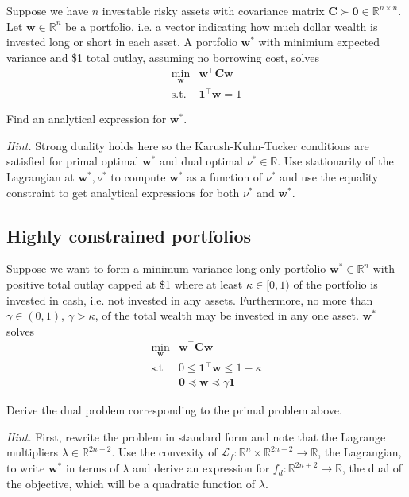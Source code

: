 \documentclass{article}
\numberwithin{equation}{section}
\begin{document}
Suppose we have $ n $ investable risky assets with covariance matrix
$ \mathbf{C} \succ \mathbf{0} \in \mathbb{R}^{n \times n} $. Let
$ \mathbf{w} \in \mathbb{R}^n $ be a portfolio, i.e. a vector indicating how
much dollar wealth is invested long or short in each asset. A portfolio
$ \mathbf{w}^* $ with minimium expected variance and \$1 total outlay,
assuming no borrowing cost, solves
\begin{equation*}
    \begin{array}{ll}
        \displaystyle\min_{\mathbf{w}} & \mathbf{w}^\top\mathbf{Cw} \\
        \text{s.t.} & \mathbf{1}^\top\mathbf{w} = 1
    \end{array}
\end{equation*}

Find an analytical expression for $ \mathbf{w}^* $.

\medskip

\textit{Hint.} Strong duality holds here so the Karush-Kuhn-Tucker conditions
are satisfied for primal optimal $ \mathbf{w}^* $ and dual optimal
$ \nu^* \in \mathbb{R} $. Use stationarity of the Lagrangian at
$ \mathbf{w}^*, \nu^* $ to compute $ \mathbf{w}^* $ as a function of
$ \nu^* $ and use the equality constraint to get analytical expressions for
both $ \nu^* $ and $ \mathbf{w}^* $.

\subsection{Highly constrained portfolios}

Suppose we want to form a minimum variance long-only portfolio
$ \mathbf{w}^* \in \mathbb{R}^n $ with positive total outlay capped at \$1
where at least $ \kappa \in [0, 1) $ of the portfolio is invested in cash,
i.e. not invested in any assets. Furthermore, no more than
$ \gamma \in (0, 1) $, $ \gamma > \kappa $, of the total wealth may be
invested in any one asset. $ \mathbf{w}^* $ solves
\begin{equation*}
    \begin{array}{ll}
        \displaystyle\min_\mathbf{w} & \mathbf{w}^\top\mathbf{Cw} \\
        \text{s.t} & 0 \le \mathbf{1}^\top\mathbf{w} \le 1 - \kappa \\
        & \mathbf{0} \preceq \mathbf{w} \preceq \gamma\mathbf{1}
    \end{array}
\end{equation*}

Derive the dual problem corresponding to the primal problem above.

\medskip

\textit{Hint.} First, rewrite the problem in standard form and note that
the Lagrange multipliers $ \lambda \in \mathbb{R}^{2n + 2} $. Use the
convexity of $ \mathcal{L}_f : \mathbb{R}^n \times \mathbb{R}^{2n + 2}
\rightarrow \mathbb{R} $, the Lagrangian, to write $ \mathbf{w}^* $ in terms
of $ \lambda $ and derive an expression for $ f_d : \mathbb{R}^{2n + 2}
\rightarrow \mathbb{R} $, the dual of the objective, which will be a quadratic
function of $ \lambda $.
\end{document}
